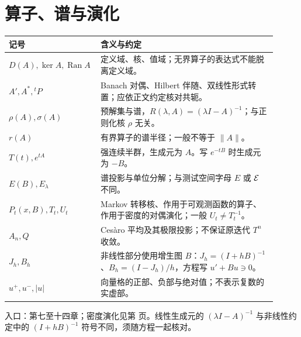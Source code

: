 \section*{算子、谱与演化}
\begin{longtable}{p{0.27\linewidth}p{0.64\linewidth}}
\toprule 记号 & 含义与约定\\\midrule\endhead
$D(A),\ker A,\operatorname{Ran}A$ & 定义域、核、值域；无界算子的表达式不能脱离定义域。\\
$A',A^*,{}^tP$ & Banach 对偶、Hilbert 伴随、双线性形式转置；应依正文约定核对共轭。\\
$\rho(A),\sigma(A)$ & 预解集与谱，$R(\lambda,A)=(\lambda I-A)^{-1}$；与正则化核 $\rho$ 无关。\\
$r(A)$ & 有界算子的谱半径；一般不等于 $\|A\|$。\\
$T(t),e^{tA}$ & 强连续半群，生成元为 $A$。写 $e^{-tB}$ 时生成元为 $-B$。\\
$E(B),E_\lambda$ & 谱投影与单位分解；与测试空间字母 $E$ 或 $\mathcal{E}$ 不同。\\
$P_t(x,B),T_t,U_t$ & Markov 转移核、作用于可观测函数的算子、作用于密度的对偶演化；一般 $U_t\ne T_t^{-1}$。\\
$A_n,Q$ & Cesàro 平均及其极限投影；不保证原迭代 $T^n$ 收敛。\\
$J_h,B_h$ & 非线性部分使用增生图 $B$：$J_h=(I+hB)^{-1}$、$B_h=(I-J_h)/h$，方程写 $u'+Bu\ni0$。\\
$u^+,u^-,|u|$ & 向量格的正部、负部与绝对值；不表示复数的实虚部。\\
\bottomrule\end{longtable}
入口：第七至十四章；密度演化见第 \pageref{prop:supp-markov-density} 页。线性生成元的 $(\lambda I-A)^{-1}$ 与非线性约定中的 $(I+hB)^{-1}$ 符号不同，须随方程一起核对。
